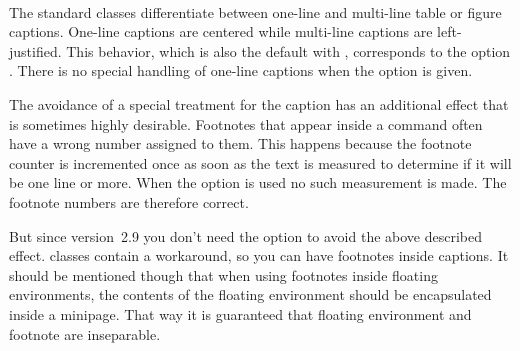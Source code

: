 \begin{Declaration}
  \\
\end{Declaration}
%
%
The standard classes differentiate between one-line and multi-line
table or figure captions. One-line captions are centered while
multi-line captions are left-justified. This behavior, which is also
the default with \KOMAScript, corresponds to the option
. There is no special handling of one-line
captions when the  option is given.

\begin{Explain}
  The avoidance of a special treatment for the caption has an
  additional effect that is sometimes highly desirable. Footnotes that
  appear inside a  command often have a wrong number
  assigned to them. This happens because the footnote counter is
  incremented once as soon as the text is measured to determine if it
  will be one line or more. When the  option
  is used no such measurement is made. The footnote numbers are
  therefore correct.

  But since {\KOMAScript} version~2.9 you don't need the option
   to avoid the above described
  effect. {\KOMAScript} classes contain a workaround, so you can have
  footnotes inside captions. It should be mentioned though that when
  using footnotes inside floating environments, the contents of the
  floating environment should be encapsulated inside a minipage. That
  way it is guaranteed that floating environment and footnote are
  inseparable.
\end{Explain}
%
%
%

